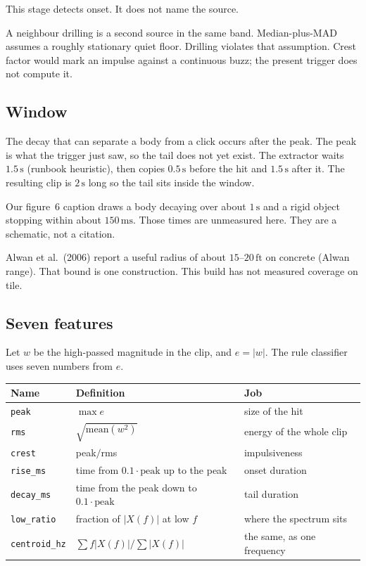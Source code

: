 \documentclass[11pt,a4paper]{article}
\newcommand{\src}[1]{\textnormal{\small (#1)}}
\begin{document}
This stage detects onset. It does not name the source.

A neighbour drilling is a second source in the same band. Median-plus-MAD assumes a roughly stationary quiet floor. Drilling violates that assumption. Crest factor would mark an impulse against a continuous buzz; the present trigger does not compute it.

\subsection{Window}

The decay that can separate a body from a click occurs after the peak. The peak is what the trigger just saw, so the tail does not yet exist. The extractor waits \(1.5\,\mathrm{s}\) \src{runbook heuristic}, then copies \(0.5\,\mathrm{s}\) before the hit and \(1.5\,\mathrm{s}\) after it. The resulting clip is \(2\,\mathrm{s}\) long so the tail sits inside the window.

Our figure~6 caption draws a body decaying over about \(1\,\mathrm{s}\) and a rigid object stopping within about \(150\,\mathrm{ms}\). Those times are unmeasured here. They are a schematic, not a citation.

Alwan et al.\ (2006) report a useful radius of about \(15\)--\(20\,\mathrm{ft}\) on concrete \src{Alwan range}. That bound is one construction. This build has not measured coverage on tile.

\subsection{Seven features}

Let \(w\) be the high-passed magnitude in the clip, and \(e=|w|\). The rule classifier uses seven numbers from \(e\).

\begin{center}
\small
\begin{tabular}{@{}lll@{}}
\toprule
Name & Definition & Job \\
\midrule
\texttt{peak} & \(\max e\) & size of the hit \\
\texttt{rms} & \(\sqrt{\mathrm{mean}(w^2)}\) & energy of the whole clip \\
\texttt{crest} & peak$/$rms & impulsiveness \\
\texttt{rise\_ms} & time from \(0.1\cdot\mathrm{peak}\) up to the peak & onset duration \\
\texttt{decay\_ms} & time from the peak down to \(0.1\cdot\mathrm{peak}\) & tail duration \\
\texttt{low\_ratio} & fraction of \(|X(f)|\) at low \(f\) & where the spectrum sits \\
\texttt{centroid\_hz} & \(\sum f|X(f)|/\sum |X(f)|\) & the same, as one frequency \\
\bottomrule
\end{tabular}
\end{center}
\end{document}
